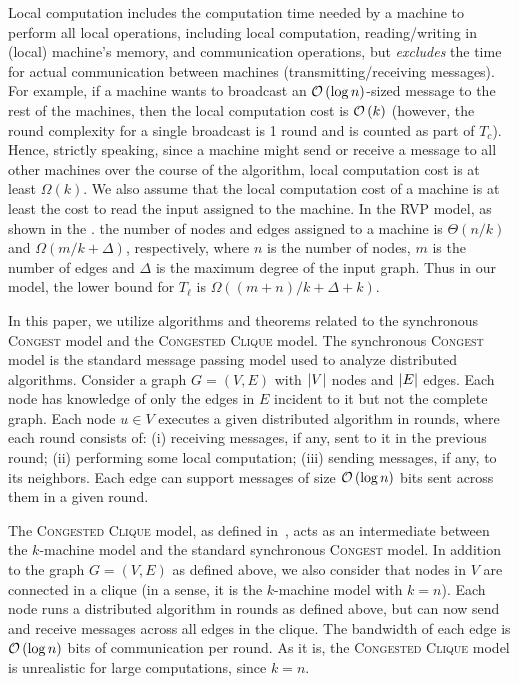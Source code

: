 Local computation includes the computation time needed by a machine to perform all local operations, including local computation, reading/writing in (local) machine's memory, and communication operations, but {\em excludes}
the time for actual communication between machines (transmitting/receiving messages). For example, if a machine wants to broadcast an $\mathcal{O}\left(\log n\right)$-sized message to the rest of the machines, then the local computation cost is $\mathcal{O}\left(k\right)$ (however,
the round complexity for a single broadcast is 1 round and is counted as part of $T_c$). Hence, strictly speaking,
since a machine might send or receive a message to all other machines over the course of the algorithm,
local computation cost is at least $\Omega(k)$. We also assume that the local computation cost
of a machine is at least the cost to read the input assigned to the machine. In the RVP model,
as shown in the .
the number of nodes and edges assigned to a machine is $\Theta(n/k)$ and  $\Omega(m/k+ \Delta)$, respectively,
where $n$ is the number of nodes, $m$ is the number of edges and $\Delta$ is the maximum degree of the input
graph. Thus in our model, the lower bound for $T_{\ell}$ is $\Omega((m+n)/k + \Delta + k)$.

In this paper, we utilize algorithms and theorems related to the synchronous \textsc{Congest} model and the \textsc{Congested Clique} model. The synchronous \textsc{Congest} model is the standard message passing model used to analyze distributed algorithms. Consider a graph \(G=(V,E)\) with \(\left\lvert V\right\rvert\) nodes and \(\left\lvert E\right\rvert\) edges. Each node has knowledge of only the edges in \(E\) incident to it but not the complete graph. Each node \(u \in V\) executes a given distributed algorithm in rounds, where each round consists of: (i) receiving messages, if any, sent to it in the previous round; (ii) performing some local computation;
(iii) sending messages, if any, to its neighbors.
Each edge can support messages of size \(\mathcal{O}\left(\log n\right)\) bits sent across them in a given round.

The \textsc{Congested Clique} model, as defined in~\cite{KlauckNPR15}, acts as an intermediate between the \(k\)-machine model and the standard synchronous \textsc{Congest} model. In addition to the graph \(G=(V,E)\) as defined above, we also consider that nodes in \(V\) are connected in a clique (in a sense, it is the $k$-machine model with $k=n$).
Each node runs a distributed algorithm in rounds as defined above, but can now send and receive messages across all edges in the clique. The bandwidth of each edge is $\mathcal{O}\left(\log n\right)$ bits of communication per round. As it is, the \textsc{Congested Clique} model is unrealistic for large computations, since $k= n$. 

